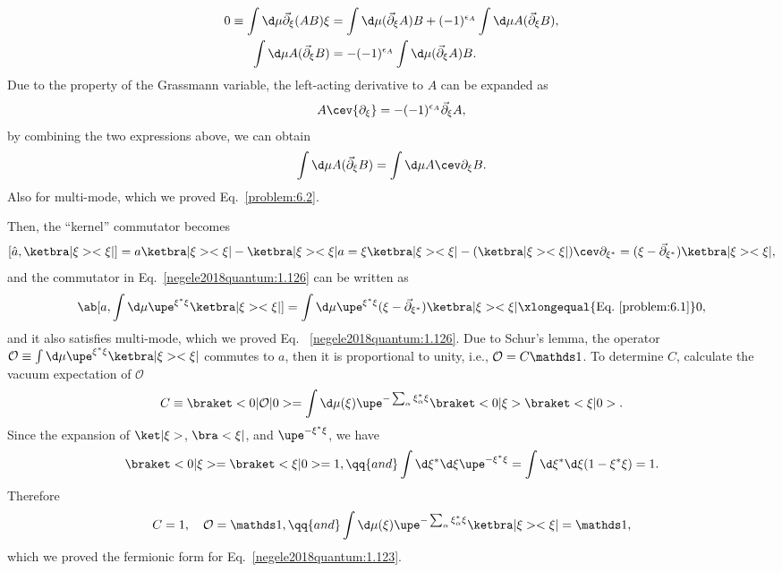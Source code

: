\begin{solution}
\begin{enumext}
    \begin{align*}
      0 \equiv \int \d\mu \vec\partial_\xi(AB)\xi
    & = \int \d\mu (\vec\partial_\xi A) B
    + (-1)^{\epsilon_A} \int \d\mu A (\vec\partial_\xi B),\\
      \int \d\mu A (\vec\partial_\xi B)
    & = -(-1)^{\epsilon_A} \int \d\mu (\vec\partial_\xi A) B.
    \end{align*}
    Due to the property of the Grassmann variable,
    the left-acting derivative to $A$ can be expanded as
    \[
      A\cev{\partial_\xi} = -(-1)^{\epsilon_A} \vec\partial_\xi A,
    \]
    by combining the two expressions above, we can obtain
    \[
      \int \d\mu A(\vec\partial_\xi B) = \int \d\mu A\cev\partial_\xi B.
    \]
    Also for multi-mode, which we proved Eq.~\eqref{problem:6.2}.
  \end{enumext}
  Then, the ``kernel'' commutator becomes
  \[
    [\hat a, \ketbra|\xi><\xi|] = a\ketbra|\xi><\xi| - \ketbra|\xi><\xi|a
  = \xi\ketbra|\xi><\xi| - (\ketbra|\xi><\xi|) \cev\partial_{\xi^*}
  = (\xi - \vec\partial_{\xi^*}) \ketbra|\xi><\xi|,
  \]
  and the commutator in Eq.~\eqref{negele2018quantum:1.126} can be written as
  \[
    \ab[a, \int \d\mu \upe^{\xi^* \xi} \ketbra|\xi><\xi|]
  = \int \d\mu \upe^{\xi^*\xi} (\xi - \vec\partial_{\xi^*}) \ketbra|\xi><\xi|
  \xlongequal{\text{Eq.~\eqref{problem:6.1}}} 0,
  \]
  and it also satisfies multi-mode, which we proved Eq.~
  \eqref{negele2018quantum:1.126}. Due to Schur's lemma, the operator
  $\mathcal O \equiv \int \d\mu \upe^{\xi^* \xi} \ketbra|\xi><\xi|$
  commutes to $a$, then it is proportional to unity,
  i.e., $\mathcal O = C\identity$. To determine $C$, calculate the vacuum
  expectation of $\mathcal O$
  \[
    C \equiv \braket<0|\mathcal O|0> = \int \d\mu(\xi)
    \upe^{-\sum_\alpha \xi_\alpha^* \xi} \braket<0|\xi> \braket<\xi|0>.
  \]
  Since the expansion of $\ket|\xi>$, $\bra<\xi|$, and $\upe^{-\xi^*\xi}$,
  we have
  \[
    \braket<0|\xi> = \braket<\xi|0> = 1, \qq{and}
    \int \d\xi^*\d\xi \upe^{-\xi^*\xi} = \int \d\xi^*\d\xi (1 - \xi^*\xi) = 1.
  \]
  Therefore
  \[
    C = 1, \quad \mathcal O = \identity, \qq{and}
    \int\d\mu(\xi) \upe^{-\sum_\alpha \xi_\alpha^* \xi} \ketbra|\xi><\xi|
  = \identity,
  \]
  which we proved the fermionic form for Eq.~\eqref{negele2018quantum:1.123}.
\end{solution}